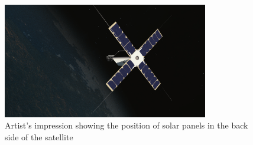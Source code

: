 \begin{figure}[h]
	\centering
	\includegraphics[width=0.8\textwidth]{img/Cubesat2_solar_panels.png}
	\caption[Solar panels distribution]{Artist's impression showing the position
	of solar panels in the back side of the satellite}
	\label{fig:solar_panels}
\end{figure}
